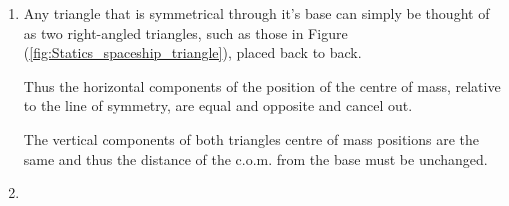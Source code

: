 \begin{problem}
{\begin{enumerate}
	As the triangle defined by $x$ and $h$ must be similar to that defined by $L$ and $H$, we know $h = \frac{Hx}{L}$.
	
	For small enough $d{x}$, the area $d{A}$ can be approximated as a rectangle, thus:
	
	\begin{equation}	d{A} = h~d{x} = \frac{H x~d{x}}{L}  \end{equation}
	
	Total moment $G$, taken around the point $x=0$, satisfies:
	
	\begin{equation}	G = M X = \sum{x~dm} = \sum{\frac{\rho H x^{2} ~dx}{L}}  \end{equation}
	
	As $dx$ goes to zero the sum of finite areas $dA$ goes to a continuous integral:
	
	\begin{equation}	G = \int_0^L \frac{\rho H x^2}{L}~ \d{x} = \frac{\rho H}{L}\left[\frac{x^3}{3}\right]^L_0 = \frac{\rho H L^2}{3}  \end{equation}
	
	Also we know $M = \rho A = \rho \frac{H L}{2}$
	
	And therefore:
	
	\begin{equation}	 \rho \frac{H L}{2} D =  \frac{\rho H L^2}{3} 
	 \Rightarrow D = \frac{2L}{3} \end{equation}
	
	Thus the centre of mass lies two thirds of the distance from the tip, and thus one third of the distance from the base.
	
	\item Any triangle that is symmetrical through it's base can simply be thought of as two right-angled triangles, such as those in Figure (\ref{fig:Statics_spaceship_triangle}), placed back to back.
	
	Thus the horizontal components of the position of the centre of mass, relative to the line of symmetry, are equal and opposite and cancel out.
	
	The vertical components of both triangles centre of mass positions are the same and thus the distance of the c.o.m. from the base must be unchanged.
	
	
	\item
	

\end{enumerate}}
\end{problem}
